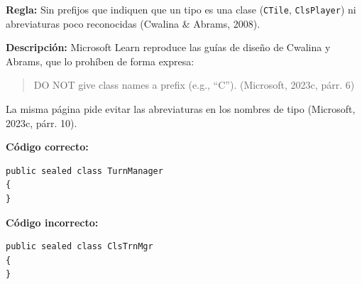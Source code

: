 \textbf{Regla:} Sin prefijos que indiquen que un tipo es una clase (\texttt{CTile}, \texttt{ClsPlayer}) ni abreviaturas poco reconocidas (Cwalina \& Abrams, 2008).

\textbf{Descripción:} Microsoft Learn reproduce las guías de diseño de Cwalina y Abrams, que lo prohíben de forma expresa:
\begin{quote}
DO NOT give class names a prefix (e.g., ``C''). (Microsoft, 2023c, párr. 6)
\end{quote}
\noindent La misma página pide evitar las abreviaturas en los nombres de tipo (Microsoft, 2023c, párr. 10).

\textbf{Código correcto:}
\begin{lstlisting}[style=csharpstyle]
public sealed class TurnManager
{
}
\end{lstlisting}

\textbf{Código incorrecto:}
\begin{lstlisting}[style=csharpstyle]
public sealed class ClsTrnMgr
{
}
\end{lstlisting}
